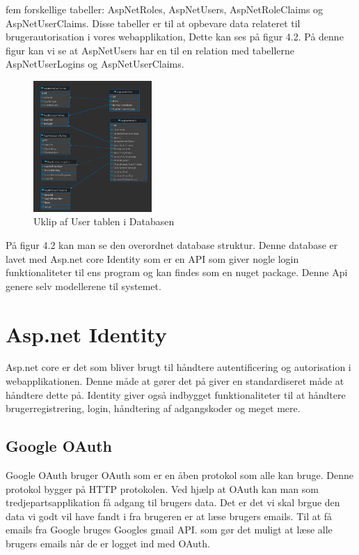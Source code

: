 fem forskellige tabeller: AspNetRoles, AspNetUsers, AspNetRoleClaims og AspNetUserClaims. 
Disse tabeller er til at opbevare data relateret til brugerautorisation i vores webapplikation, Dette kan ses på figur 4.2. På denne figur 
kan vi se at AspNetUsers har en til en relation med tabellerne AspNetUserLogins og AspNetUserClaims. 


\begin{figure} 
    \includegraphics[width=0.4\textwidth]{./Pictures/database-diagram.png}
    \caption{Uklip af User tablen i Databasen}
    \label{fig:databaseUserTable}
\end{figure}

På figur 4.2 kan man se den overordnet database struktur. Denne database er lavet med
Asp.net core Identity som er en API som giver nogle login funktionaliteter til ens program
og kan findes som en nuget package. Denne Api genere selv modellerene til systemet.  




\section{Asp.net Identity}
Asp.net core er det som bliver brugt til håndtere autentificering og autorisation i webapplikationen.
Denne måde at gører det på giver en standardiseret måde at håndtere dette på. Identity giver også indbygget
funktionaliteter til at håndtere brugerregistrering, login, håndtering af adgangskoder og meget mere.

\subsection{Google OAuth}
Google OAuth bruger OAuth som er en åben protokol som alle kan bruge. Denne protokol bygger på
HTTP protokolen. Ved hjælp at OAuth kan man som tredjepartsapplikation få adgang til brugers data.
Det er det vi skal brgue den data vi godt vil have fandt i fra brugeren er at læse brugers emails. 
Til at få emails fra Google bruges Googles gmail API. som gør det muligt at læse alle brugers emails når de
er logget ind med OAuth.
\newpage
